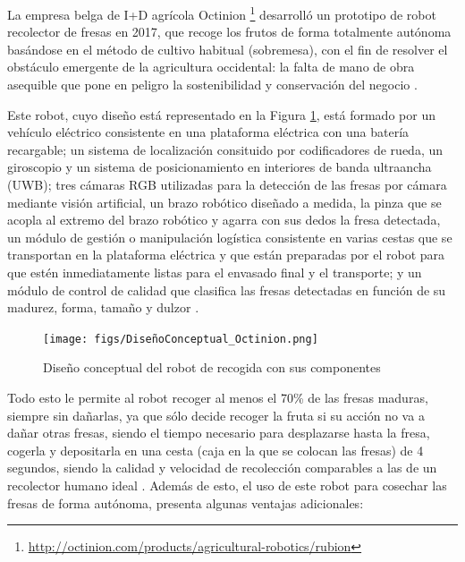 La empresa belga de I+D agrícola Octinion \footnote{\url{http://octinion.com/products/agricultural-robotics/rubion}} desarrolló un prototipo de robot recolector de fresas en 2017, que recoge los frutos de forma totalmente autónoma basándose en el método de cultivo habitual (sobremesa), con el fin de resolver el obstáculo emergente de la agricultura occidental: la falta de mano de obra asequible que pone en peligro la sostenibilidad y conservación del negocio \cite{DePreter18}.

Este robot, cuyo diseño está representado en la Figura \ref{fig:DiseñoConceptual_Octinion}, está formado por un vehículo eléctrico consistente en una plataforma eléctrica con una batería recargable; un sistema de localización consituido por codificadores de rueda, un giroscopio y un sistema de posicionamiento en interiores de banda ultraancha (UWB); tres cámaras RGB utilizadas para la detección de las fresas por cámara mediante visión artificial, un brazo robótico diseñado a medida, la pinza que se acopla al extremo del brazo robótico y agarra con sus dedos la fresa detectada, un módulo de gestión o manipulación logística consistente en varias cestas que se transportan en la plataforma eléctrica y que están preparadas por el robot para que estén inmediatamente listas para el envasado final y el transporte; y un módulo de control de calidad que clasifica las fresas detectadas en función de su madurez, forma, tamaño y dulzor \cite{DePreter18}.

\begin{figure} [H]
    \begin{center}
      \texttt{[image: figs/DiseñoConceptual\_Octinion.png]}
    \end{center}
    \caption{Diseño conceptual del robot de recogida con sus componentes}
    \label{fig:DiseñoConceptual_Octinion}
\end{figure}

Todo esto le permite al robot recoger al menos el 70\% de las fresas maduras, siempre sin dañarlas, ya que sólo decide recoger la fruta si su acción no va a dañar otras fresas, siendo el tiempo necesario para desplazarse hasta la fresa, cogerla y depositarla en una cesta (caja en la que se colocan las
fresas) de 4 segundos, siendo la calidad y velocidad de recolección comparables a las de un recolector humano ideal \cite{DePreter18}. Además de esto, el uso de este robot para cosechar las fresas de forma autónoma, presenta algunas ventajas adicionales:

